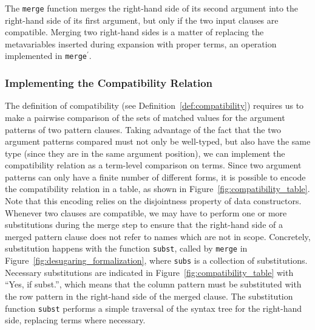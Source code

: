 The \texttt{merge} function merges the right-hand side of its second argument
into the right-hand side of its first argument, but only if the two input
clauses are compatible. Merging two right-hand sides is a matter of replacing
the metavariables inserted during expansion with proper terms, an operation
implemented in \texttt{merge$^\prime$}.

\subsubsection{Implementing the Compatibility Relation}
The definition of compatibility (see Definition~\ref{def:compatibility})
requires us to make a pairwise comparison of the sets of matched values for the
argument patterns of two pattern clauses. Taking advantage of the fact that the
two argument patterns compared must not only be well-typed, but also have the
same type (since they are in the same argument position), we can implement the
compatibility relation as a term-level comparison on \IdrisM{} terms. Since two
argument patterns can only have a finite number of different forms, it is
possible to encode the compatibility relation in a table, as shown in
Figure~\ref{fig:compatibility_table}. Note that this encoding relies on the
disjointness property of data constructors. Whenever two clauses are compatible,
we may have to perform one or more substitutions during the merge step to ensure
that the right-hand side of a merged pattern clause does not refer to names
which are not in scope. Concretely, substitution happens with the function
\texttt{subst}, called by \texttt{merge} in
Figure~\ref{fig:desugaring_formalization}, where \texttt{subs} is a collection
of substitutions. Necessary substitutions are indicated in
Figure~\ref{fig:compatibility_table} with ``Yes, if subst.'', which means that
the column pattern must be substituted with the row pattern in the right-hand
side of the merged clause. The substitution function \texttt{subst} performs a
simple traversal of the syntax tree for the right-hand side, replacing terms
where necessary.

